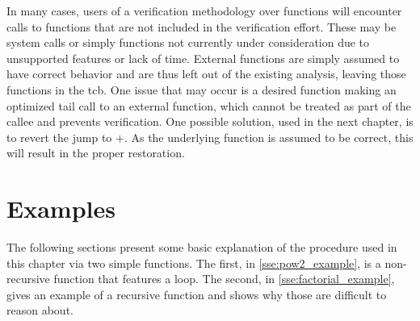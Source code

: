 In many cases, users of a verification methodology over functions
will encounter calls to functions that are not included in the verification effort.
These may be system calls or simply functions not currently under consideration
due to unsupported features or lack of time.
External functions are simply assumed to have correct behavior
and are thus left out of the existing analysis,
leaving those functions in the \ac{tcb}.
One issue that may occur is a desired function
making an optimized tail call to an external function,
which cannot be treated as part of the callee and prevents verification.
One possible solution, used in the next chapter,
is to revert the jump to +.
As the underlying function is assumed to be correct,
this will result in the proper  restoration.

\section{Examples}\label{se:cfg_examples}
The following sections present some basic explanation
of the procedure used in this chapter via two simple functions.
The first, in \cref{sse:pow2_example}, is a non-recursive function that features a loop.
The second, in \cref{sse:factorial_example}, gives an example of a recursive function
and shows why those are difficult to reason about.

